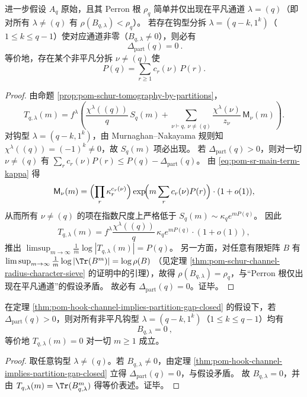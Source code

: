 \begin{theorem}[钩型通道 \texorpdfstring{$\Rightarrow$}{=>} 共振间隙闭合]\label{thm:pom-hook-channel-implies-partition-gap-closed}
进一步假设 \(A_q\) 原始，且其 Perron 根 \(\rho_q\) 简单并仅出现在平凡通道 \(\lambda=(q)\)（即对所有 \(\lambda\neq(q)\) 有 \(\rho(B_{q,\lambda})<\rho_q\)）。
若存在钩型分拆 \(\lambda=(q-k,1^k)\)（\(1\le k\le q-1\)）使对应通道非零（\(B_{q,\lambda}\neq 0\)），则必有
\[
\boxed{\ \Delta_{\mathrm{part}}(q)=0\ }.
\]
等价地，存在某个非平凡分拆 \(\nu\neq(q)\) 使
\[
P(q)=\sum_{r\ge 1}c_r(\nu)\,P(r).
\]
\end{theorem}
\begin{proof}
由命题 \ref{prop:pom-schur-tomography-by-partitions}，
\[
T_{q,\lambda}(m)
=
f^\lambda\left(\frac{\chi^\lambda((q))}{q}\,S_q(m)+\sum_{\nu\vdash q,\ \nu\neq(q)}\frac{\chi^\lambda(\nu)}{z_\nu}\,\mathsf{M}_\nu(m)\right).
\]
对钩型 \(\lambda=(q-k,1^k)\)，由 Murnaghan--Nakayama 规则知 \(\chi^\lambda((q))=(-1)^k\neq 0\)，故 \(S_q(m)\) 项必出现。
若 \(\Delta_{\mathrm{part}}(q)>0\)，则对一切 \(\nu\neq(q)\) 有
\(
\sum_r c_r(\nu)P(r)\le P(q)-\Delta_{\mathrm{part}}(q)
\)。
由 \eqref{eq:pom-sr-main-term-kappa} 得
\[
\mathsf{M}_\nu(m)
=
\Bigl(\prod_r \kappa_r^{c_r(\nu)}\Bigr)\exp\!\Bigl(m\sum_r c_r(\nu)P(r)\Bigr)\cdot(1+o(1)),
\]
从而所有 \(\nu\neq(q)\) 的项在指数尺度上严格低于 \(S_q(m)\sim \kappa_q e^{mP(q)}\)。
因此
\[
T_{q,\lambda}(m)
=
f^\lambda\frac{\chi^\lambda((q))}{q}\,\kappa_q e^{mP(q)}\cdot(1+o(1)),
\]
推出
\(
\limsup_{m\to\infty}\frac{1}{m}\log|T_{q,\lambda}(m)|=P(q)
\)。
另一方面，对任意有限矩阵 \(B\) 有
\(
\limsup_{m\to\infty}\frac{1}{m}\log|\Tr(B^m)|=\log\rho(B)
\)
（见定理 \ref{thm:pom-schur-channel-radius-character-sieve} 的证明中的引理），故得 \(\rho(B_{q,\lambda})=\rho_q\)，与“Perron 根仅出现在平凡通道”的假设矛盾。
故必有 \(\Delta_{\mathrm{part}}(q)=0\)。证毕。
\end{proof}

\begin{theorem}[严格分拆间隙 \texorpdfstring{$\Rightarrow$}{=>} 钩型通道湮灭]\label{thm:pom-partition-gap-positive-kills-hooks}
在定理 \ref{thm:pom-hook-channel-implies-partition-gap-closed} 的假设下，若 \(\Delta_{\mathrm{part}}(q)>0\)，则对所有非平凡钩型 \(\lambda=(q-k,1^k)\)（\(1\le k\le q-1\)）均有
\[
\boxed{\ B_{q,\lambda}=0\ },
\]
等价地 \(T_{q,\lambda}(m)=0\) 对一切 \(m\ge 1\) 成立。
\end{theorem}
\begin{proof}
取任意钩型 \(\lambda\neq(q)\)。若 \(B_{q,\lambda}\neq 0\)，由定理 \ref{thm:pom-hook-channel-implies-partition-gap-closed} 立得 \(\Delta_{\mathrm{part}}(q)=0\)，与假设矛盾。
故 \(B_{q,\lambda}=0\)，并由 \(T_{q,\lambda}(m)=\Tr(B_{q,\lambda}^m)\) 得等价表述。证毕。
\end{proof}

